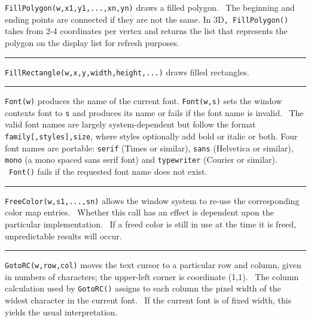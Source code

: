 \noindent
\texttt{FillPolygon(w,x1,y1,...,xn,yn)} draws a filled polygon. \ The
beginning and ending points are connected if they are not the same. In
3D\texttt{, FillPolygon()} takes from 2-4 coordinates per vertex and
returns the list that represents the polygon on the display list for
refresh purposes. 

\bigskip\hrule\vspace{0.1cm}

\noindent
\texttt{FillRectangle(w,x,y,width,height,...)} draws filled rectangles.

\bigskip\hrule\vspace{0.1cm}

\noindent
\texttt{Font(w)} produces the name of the current font.
\texttt{Font(w,s)} sets the window context{\textquotesingle}s font to
\texttt{s} and produces its name or fails if the font name is invalid.
\ The valid font names are largely system-dependent but follow the
format \texttt{family[,styles],size}, where styles optionally add bold
or italic or both. Four font names are portable: \texttt{serif} (Times
or similar), \texttt{sans} (Helvetica or similar), \texttt{mono} (a
mono spaced sans serif font) and \texttt{typewriter} (Courier or
similar). \ \texttt{Font()} fails if the requested font name does not
exist.

\bigskip\hrule\vspace{0.1cm}

\noindent
\texttt{FreeColor(w,s1,...,sn)} allows the window system to re-use the
corresponding color map entries. \ Whether this call has an effect is
dependent upon the particular implementation. \ If a freed color is
still in use at the time it is freed, unpredictable results will occur.

\bigskip\hrule\vspace{0.1cm}

\noindent
\texttt{GotoRC(w,row,col)} moves the text cursor to a particular row and
column, given in numbers of characters; the upper-left corner is
coordinate (1,1). \ The column calculation used by \texttt{GotoRC()}
assigns to each column the pixel width of the widest character in the
current font. \ If the current font is of fixed width, this yields the
usual interpretation.

